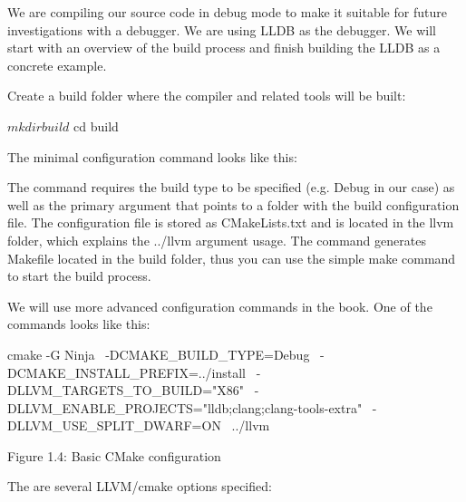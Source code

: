 

We are compiling our source code in debug mode to make it suitable for future investigations with a debugger. We are using LLDB as the debugger. We will start with an overview of the build process and finish building the LLDB as a concrete example.



Create a build folder where the compiler and related tools will be built:

\begin{shell}
$ mkdir build
$ cd build
\end{shell}

The minimal configuration command looks like this:


The command requires the build type to be specified (e.g. Debug in our case) as well as the primary argument that points to a folder with the build configuration file. The configuration file is stored as CMakeLists.txt and is located in the llvm folder, which explains the ../llvm argument usage. The command generates Makefile located in the build folder, thus you can use the simple make command to start the build process.

We will use more advanced configuration commands in the book. One of the commands looks like this:

\begin{shell}
cmake -G Ninja \
  -DCMAKE_BUILD_TYPE=Debug \
  -DCMAKE_INSTALL_PREFIX=../install \
  -DLLVM_TARGETS_TO_BUILD="X86" \
  -DLLVM_ENABLE_PROJECTS="lldb;clang;clang-tools-extra" \
  -DLLVM_USE_SPLIT_DWARF=ON \
  ../llvm
\end{shell}

\begin{center}
Figure 1.4: Basic CMake configuration
\end{center}

The are several LLVM/cmake options specified:

